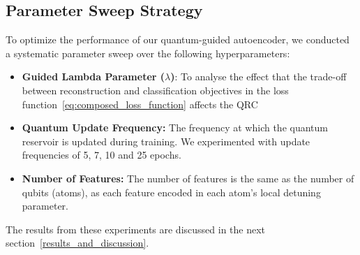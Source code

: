 \documentclass[conference]{IEEEtran}
\begin{document}

    
    
    


\subsection{Parameter Sweep Strategy}
To optimize the performance of our quantum-guided autoencoder, 
we conducted a systematic parameter sweep over the following hyperparameters:
\begin{itemize}
    \item \textbf{Guided Lambda Parameter (\( \lambda \))}: 
    To analyse the effect that the trade-off between reconstruction and classification objectives in the loss function~\eqref{eq:composed_loss_function} affects
    the QRC
    
    \item \textbf{Quantum Update Frequency:} 
    The frequency at which the quantum reservoir is updated during training. We experimented with update frequencies of 5, 7, 10 and 25 epochs.


    \item \textbf{Number of Features:}
    The number of features is the same as the number of qubits (atoms), 
    as each feature encoded in each atom's local detuning parameter.
    
\end{itemize}
The results from these experiments are discussed in the next section~\ref{results_and_discussion}.
\end{document}
